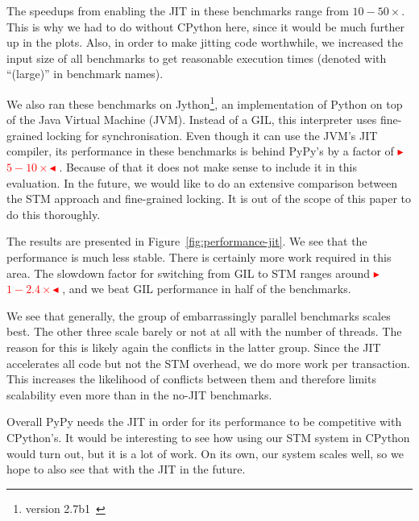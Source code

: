 \documentclass{sigplanconf}
\newcommand{\mynote}[2]{%
  \textcolor{red}{%
    \fbox{\bfseries\sffamily\scriptsize#1}%
    {\small$\blacktriangleright$\textsf{\emph{#2}}$\blacktriangleleft$}%
  }%
}
\newcommand\remi[1]{\mynote{Remi}{#1}}
\begin{document}
The speedups from enabling the JIT in these benchmarks range from
$10-50\times$. This is why we had to do without CPython here, since it
would be much further up in the plots. Also, in order to make jitting
code worthwhile, we increased the input size of all benchmarks to get
reasonable execution times (denoted with ``(large)'' in benchmark names).

We also ran these benchmarks on Jython\footnote{version
2.7b1~\cite{webjython}}, an implementation of Python on top of the
Java Virtual Machine (JVM).  Instead of a GIL, this interpreter uses
fine-grained locking for synchronisation. Even though it can use the
JVM's JIT compiler, its performance in these benchmarks is behind
PyPy's by a factor of \remi{$5-10\times$}. Because of that it does not
make sense to include it in this evaluation. In the future, we would
like to do an extensive comparison between the STM approach and
fine-grained locking. It is out of the scope of this paper to do
this thoroughly.

The results are presented in Figure~\ref{fig:performance-jit}. We
see that the performance is much less stable. There is certainly more
work required in this area. The slowdown factor for switching from GIL
to STM ranges around \remi{$1-2.4\times$}, and we beat GIL performance
in half of the benchmarks.

We see that generally, the group of embarrassingly parallel benchmarks scales
best. The other three scale barely or not at all with the number of
threads. The reason for this is likely again the conflicts in the
latter group. Since the JIT accelerates all code but not the STM
overhead, we do more work per transaction. This increases the
likelihood of conflicts between them and therefore limits scalability
even more than in the no-JIT benchmarks.

Overall PyPy needs the JIT in order for its performance to be
competitive with CPython's. It would be interesting to see how using
our STM system in CPython would turn out, but it is a lot of work. On
its own, our system scales well, so we hope to also see that with the
JIT in the future.
\end{document}
